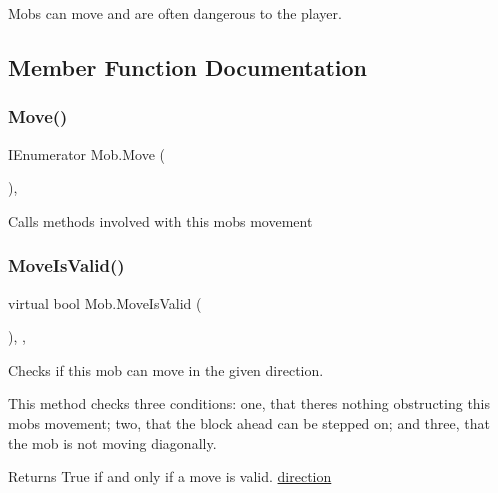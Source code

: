 Mobs can move and are often dangerous to the player. 

\subsection{Member Function Documentation}
\mbox{\label{class_mob_aca6588515e7a5daa0e1c8f274c37e46f}} 
\subsubsection{\texorpdfstring{Move()}{Move()}}
{\footnotesize\ttfamily I\+Enumerator Mob.\+Move (\begin{DoxyParamCaption}{ }\end{DoxyParamCaption})\hspace{0.3cm}{\ttfamily [inline]}, {\ttfamily [protected]}}



Calls methods involved with this mob\textquotesingle{}s movement 

\mbox{\label{class_mob_a9f08167514165ff0aa3683091db87133}} 
\subsubsection{\texorpdfstring{Move\+Is\+Valid()}{MoveIsValid()}}
{\footnotesize\ttfamily virtual bool Mob.\+Move\+Is\+Valid (\begin{DoxyParamCaption}{ }\end{DoxyParamCaption})\hspace{0.3cm}{\ttfamily [inline]}, {\ttfamily [protected]}, {\ttfamily [virtual]}}



Checks if this mob can move in the given direction. 

This method checks three conditions\+: one, that there\textquotesingle{}s nothing obstructing this mob\textquotesingle{}s movement; two, that the block ahead can be stepped on; and three, that the mob is not moving diagonally. 

\begin{DoxyReturn}{Returns}
True if and only if a move is valid. \mbox{\hyperlink{class_mob_a9e4730b2cbbb1230028177caf997a70e}{direction}} 
\end{DoxyReturn}
\mbox{\label{class_mob_a3eb78b08b3605ddc4b37395b18437c7d}} 
